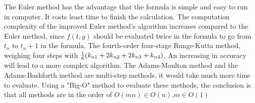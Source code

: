 \documentclass[a4paper]{article}
\begin{document}
	\begin{table}[H]
		\centering
		\caption{Time Consuming  with different h in IVP2}
		\label{tab:IVP2}
	\end{table}
	
	The Euler method has the advantage that the formula is simple and easy to run in computer. It costs least time to finish the calculation.
	The computation complexity of the improved Euler method’s algorithm increases compared to the Euler method, since $f(t,y)$ should be evaluated twice in the formula to go from $t_n$ to $t_n+1$ in the formula.
	The fourth-order four-stage Runge-Kutta method, weighing four steps with ${1\over6}(k_{n1}+2k_{n2}+2k_{n3}+k_{n4})$. An increasing in accuracy will lead to a more complex algorithm.
	The Adams-Moulton method and the Adams-Bashforth method are multi-step methods, it would take much more time to evaluate.
	Using a "Big-O" method to evaluate these methods, the conclusion is that all methods are in the order of $O(mn)\in{O(n)}$,$m\in{O(1)}$
	
\end{document}
